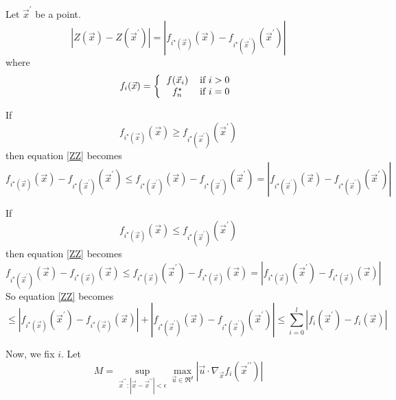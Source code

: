 \documentclass[phd,tocprelim]{cornell}
\begin{document}
Let $\vec{x}^{\prime}$ be a point.
\begin{equation}
    \left|Z(\vec{x}) - Z(\vec{x}^{\prime})\right| = \left|f_{i^{\star}(\vec{x})}(\vec{x}) - f_{i^{\star}(\vec{x}^{\prime})}(\vec{x}^{\prime})\right|
    \label{ZZ}
\end{equation}
where
\begin{equation}
    f_{i}(\vec{x}) = \left\{ \begin{tabular}{cc}
        $f(\vec{x}_{i})$ & if $i > 0$ \\
        $f_{n}^{\star}$ & if $i = 0$
    \end{tabular} \right.
\end{equation}

If
\begin{equation}
    f_{i^{\star}(\vec{x})}(\vec{x}) \geq f_{i^{\star}(\vec{x}^{\prime})}(\vec{x}^{\prime})
\end{equation}
then equation \ref{ZZ} becomes
\begin{equation}
    f_{i^{\star}(\vec{x})}(\vec{x}) - f_{i^{\star}(\vec{x}^{\prime})}(\vec{x}^{\prime}) \leq f_{i^{\star}(\vec{x}^{\prime})}(\vec{x}) - f_{i^{\star}(\vec{x}^{\prime})}(\vec{x}^{\prime}) = \left|f_{i^{\star}(\vec{x}^{\prime})}(\vec{x}) - f_{i^{\star}(\vec{x}^{\prime})}(\vec{x}^{\prime})\right|
\end{equation}

If
\begin{equation}
    f_{i^{\star}(\vec{x})}(\vec{x}) \leq f_{i^{\star}(\vec{x}^{\prime})}(\vec{x}^{\prime})
\end{equation}
then equation \ref{ZZ} becomes
\begin{equation}
    f_{i^{\star}(\vec{x}^{\prime})}(\vec{x}) - f_{i^{\star}(\vec{x})}(\vec{x}) \leq f_{i^{\star}(\vec{x})}(\vec{x}^{\prime}) - f_{i^{\star}(\vec{x})}(\vec{x}) = \left|f_{i^{\star}(\vec{x})}(\vec{x}^{\prime}) - f_{i^{\star}(\vec{x})}(\vec{x})\right|
\end{equation}
So equation \ref{ZZ} becomes
\begin{equation}
    \leq \left|f_{i^{\star}(\vec{x})}(\vec{x}^{\prime}) - f_{i^{\star}(\vec{x})}(\vec{x})\right| + \left|f_{i^{\star}(\vec{x}^{\prime})}(\vec{x}) - f_{i^{\star}(\vec{x}^{\prime})}(\vec{x}^{\prime})\right| \leq \sum_{i=0}^{l} \left|f_{i}(\vec{x}^{\prime}) - f_{i}(\vec{x})\right|
\end{equation}

Now, we fix $i$. Let
\begin{equation}
    M = \sup_{\vec{x}^{\prime\prime}:|\vec{x} - \vec{x}^{\prime\prime}| < \epsilon} \max_{\vec{u} \in \Re^{d}} \left|\vec{u} \cdot \nabla_{\vec{x}} f_{i}(\vec{x}^{\prime\prime}) \right|
\end{equation}
\end{document}
